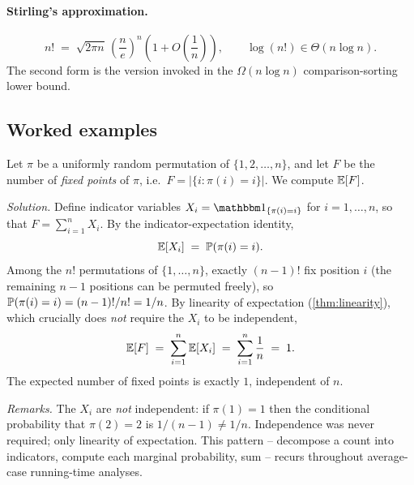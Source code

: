 \paragraph{Stirling's approximation.}
\[
  n! \;=\; \sqrt{2\pi n}\,\left(\frac{n}{e}\right)^{\!n}\!\left(1 + O\!\left(\frac{1}{n}\right)\right),
  \qquad \log(n!) \in \Theta(n \log n).
\]
The second form is the version invoked in the $\Omega(n \log n)$ comparison-sorting lower bound.

\subsection{Worked examples}

\begin{example}
\label{ex:fixed_points}
Let $\pi$ be a uniformly random permutation of $\{1, 2, \dots, n\}$, and let $F$ be the number of \emph{fixed points} of $\pi$, i.e.\ $F = |\{i : \pi(i) = i\}|$. We compute $\operatorname{\mathbb{E}}[F]$.

\medskip
\noindent\textit{Solution.} Define indicator variables $X_i = \indic_{\{\pi(i) = i\}}$ for $i = 1, \dots, n$, so that $F = \sum_{i=1}^n X_i$. By the indicator-expectation identity,
\[
  \operatorname{\mathbb{E}}[X_i] \;=\; \operatorname{\mathbb{P}}(\pi(i) = i).
\]
Among the $n!$ permutations of $\{1, \dots, n\}$, exactly $(n-1)!$ fix position $i$ (the remaining $n-1$ positions can be permuted freely), so $\operatorname{\mathbb{P}}(\pi(i) = i) = (n-1)!/n! = 1/n$. By linearity of expectation (\cref{thm:linearity}), which crucially does \emph{not} require the $X_i$ to be independent,
\[
  \operatorname{\mathbb{E}}[F] \;=\; \sum_{i=1}^{n} \operatorname{\mathbb{E}}[X_i] \;=\; \sum_{i=1}^{n} \frac{1}{n} \;=\; 1.
\]
The expected number of fixed points is exactly $1$, independent of $n$.

\medskip
\noindent\textit{Remarks.} The $X_i$ are \emph{not} independent: if $\pi(1) = 1$ then the conditional probability that $\pi(2) = 2$ is $1/(n-1) \ne 1/n$. Independence was never required; only linearity of expectation. This pattern -- decompose a count into indicators, compute each marginal probability, sum -- recurs throughout average-case running-time analyses.
\end{example}


